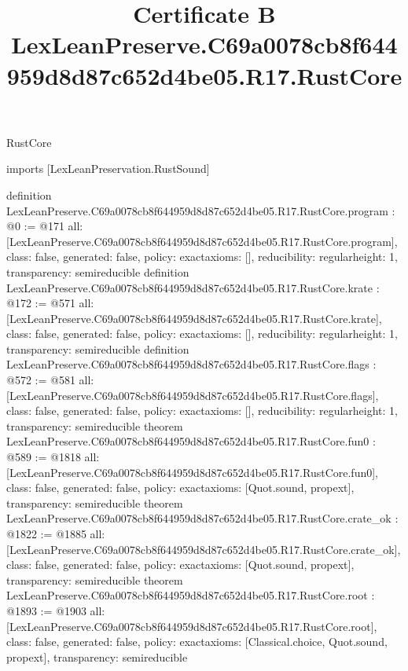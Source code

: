 \begin{lexlean}{RustCore}
\title{Certificate B LexLeanPreserve.C69a0078cb8f644959d8d87c652d4be05.R17.RustCore}
\begin{coremodule}
imports [LexLeanPreservation.RustSound]

definition LexLeanPreserve.C69a0078cb8f644959d8d87c652d4be05.R17.RustCore.program : @0 := @171 {
  all: [LexLeanPreserve.C69a0078cb8f644959d8d87c652d4be05.R17.RustCore.program],
  class: false,
  generated: false,
  policy: exact{axioms: []},
  reducibility: regular{height: 1},
  transparency: semireducible
}
definition LexLeanPreserve.C69a0078cb8f644959d8d87c652d4be05.R17.RustCore.krate : @172 := @571 {
  all: [LexLeanPreserve.C69a0078cb8f644959d8d87c652d4be05.R17.RustCore.krate],
  class: false,
  generated: false,
  policy: exact{axioms: []},
  reducibility: regular{height: 1},
  transparency: semireducible
}
definition LexLeanPreserve.C69a0078cb8f644959d8d87c652d4be05.R17.RustCore.flags : @572 := @581 {
  all: [LexLeanPreserve.C69a0078cb8f644959d8d87c652d4be05.R17.RustCore.flags],
  class: false,
  generated: false,
  policy: exact{axioms: []},
  reducibility: regular{height: 1},
  transparency: semireducible
}
theorem LexLeanPreserve.C69a0078cb8f644959d8d87c652d4be05.R17.RustCore.fun0 : @589 := @1818 {
  all: [LexLeanPreserve.C69a0078cb8f644959d8d87c652d4be05.R17.RustCore.fun0],
  class: false,
  generated: false,
  policy: exact{axioms: [Quot.sound, propext]},
  transparency: semireducible
}
theorem LexLeanPreserve.C69a0078cb8f644959d8d87c652d4be05.R17.RustCore.crate_ok : @1822 := @1885 {
  all: [LexLeanPreserve.C69a0078cb8f644959d8d87c652d4be05.R17.RustCore.crate_ok],
  class: false,
  generated: false,
  policy: exact{axioms: [Quot.sound, propext]},
  transparency: semireducible
}
theorem LexLeanPreserve.C69a0078cb8f644959d8d87c652d4be05.R17.RustCore.root : @1893 := @1903 {
  all: [LexLeanPreserve.C69a0078cb8f644959d8d87c652d4be05.R17.RustCore.root],
  class: false,
  generated: false,
  policy: exact{axioms: [Classical.choice, Quot.sound, propext]},
  transparency: semireducible
}


\end{coremodule}
\end{lexlean}
